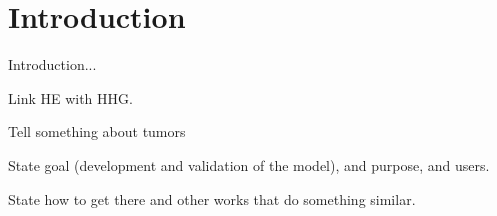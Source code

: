 \section{Introduction}

Introduction...

Link HE with HHG.

Tell something about tumors

State goal (development and validation of the model), and purpose, and users.

State how to get there and other works that do something similar.
